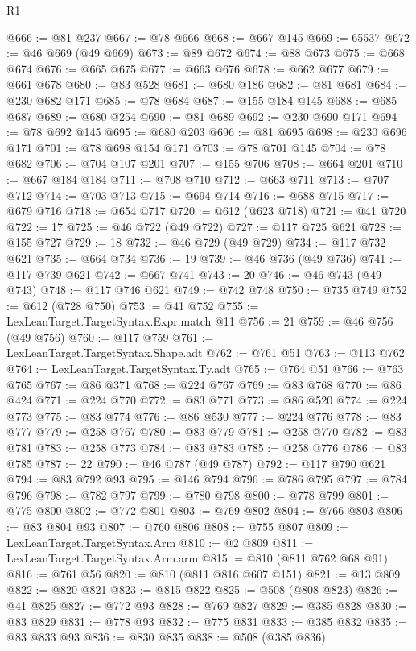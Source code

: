 \begin{lexlean}{R1}
\begin{coremodule}
@666 := @81 @237
@667 := @78 @666
@668 := @667 @145
@669 := 65537
@672 := @46 @669 (@49 @669)
@673 := @89 @672
@674 := @88 @673
@675 := @668 @674
@676 := @665 @675
@677 := @663 @676
@678 := @662 @677
@679 := @661 @678
@680 := @83 @528
@681 := @680 @186
@682 := @81 @681
@684 := @230 @682 @171
@685 := @78 @684
@687 := @155 @184 @145
@688 := @685 @687
@689 := @680 @254
@690 := @81 @689
@692 := @230 @690 @171
@694 := @78 @692 @145
@695 := @680 @203
@696 := @81 @695
@698 := @230 @696 @171
@701 := @78 @698 @154 @171
@703 := @78 @701 @145
@704 := @78 @682
@706 := @704 @107 @201
@707 := @155 @706
@708 := @664 @201
@710 := @667 @184 @184
@711 := @708 @710
@712 := @663 @711
@713 := @707 @712
@714 := @703 @713
@715 := @694 @714
@716 := @688 @715
@717 := @679 @716
@718 := @654 @717
@720 := @612 (@623 @718)
@721 := @41 @720
@722 := 17
@725 := @46 @722 (@49 @722)
@727 := @117 @725 @621
@728 := @155 @727
@729 := 18
@732 := @46 @729 (@49 @729)
@734 := @117 @732 @621
@735 := @664 @734
@736 := 19
@739 := @46 @736 (@49 @736)
@741 := @117 @739 @621
@742 := @667 @741
@743 := 20
@746 := @46 @743 (@49 @743)
@748 := @117 @746 @621
@749 := @742 @748
@750 := @735 @749
@752 := @612 (@728 @750)
@753 := @41 @752
@755 := LexLeanTarget.TargetSyntax.Expr.match @11
@756 := 21
@759 := @46 @756 (@49 @756)
@760 := @117 @759
@761 := LexLeanTarget.TargetSyntax.Shape.adt
@762 := @761 @51
@763 := @113 @762
@764 := LexLeanTarget.TargetSyntax.Ty.adt
@765 := @764 @51
@766 := @763 @765
@767 := @86 @371
@768 := @224 @767
@769 := @83 @768
@770 := @86 @424
@771 := @224 @770
@772 := @83 @771
@773 := @86 @520
@774 := @224 @773
@775 := @83 @774
@776 := @86 @530
@777 := @224 @776
@778 := @83 @777
@779 := @258 @767
@780 := @83 @779
@781 := @258 @770
@782 := @83 @781
@783 := @258 @773
@784 := @83 @783
@785 := @258 @776
@786 := @83 @785
@787 := 22
@790 := @46 @787 (@49 @787)
@792 := @117 @790 @621
@794 := @83 @792 @93
@795 := @146 @794
@796 := @786 @795
@797 := @784 @796
@798 := @782 @797
@799 := @780 @798
@800 := @778 @799
@801 := @775 @800
@802 := @772 @801
@803 := @769 @802
@804 := @766 @803
@806 := @83 @804 @93
@807 := @760 @806
@808 := @755 @807
@809 := LexLeanTarget.TargetSyntax.Arm
@810 := @2 @809
@811 := LexLeanTarget.TargetSyntax.Arm.arm
@815 := @810 (@811 @762 @68 @91)
@816 := @761 @56
@820 := @810 (@811 @816 @607 @151)
@821 := @13 @809
@822 := @820 @821
@823 := @815 @822
@825 := @508 (@808 @823)
@826 := @41 @825
@827 := @772 @93
@828 := @769 @827
@829 := @385 @828
@830 := @83 @829
@831 := @778 @93
@832 := @775 @831
@833 := @385 @832
@835 := @83 @833 @93
@836 := @830 @835
@838 := @508 (@385 @836)

\end{coremodule}
\end{lexlean}
